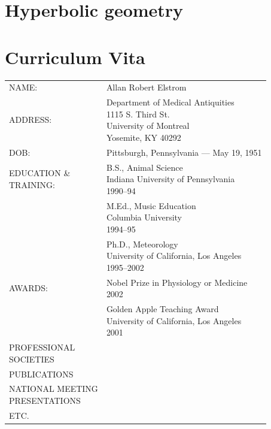 \documentclass{uoflthesis} %
\begin{document}
\nocite{*}



\appendix

\chapter{Hyperbolic geometry}

\lipsum

\chapter*{Curriculum Vita}

\singlespacing
\renewcommand{\arraystretch}{2}

\begin{tabular}{ll}
NAME: & Allan Robert Elstrom\\
ADDRESS: & \makecell[lt]{Department of Medical Antiquities\\1115 S. Third St.\\University of Montreal\\Yosemite, KY 40292}\\
DOB: & Pittsburgh, Pennsylvania --- May 19, 1951\\
\makecell[lb]{EDUCATION \&\\ TRAINING:} & \makecell[lt]{B.S., Animal Science\\Indiana University of Pennsylvania\\1990--94}\\
    &\makecell[lt]{M.Ed., Music Education\\Columbia University\\1994--95}\\
    &\makecell[lt]{Ph.D., Meteorology\\University of California, Los Angeles\\1995--2002}\\
AWARDS: & \makecell[lt]{Nobel Prize in Physiology or Medicine\\2002}\\
    &\makecell[lt]{Golden Apple Teaching Award\\University of California, Los Angeles\\2001}\\
\makecell[lb]{PROFESSIONAL\\SOCIETIES}\\
PUBLICATIONS\\
\makecell[lb]{NATIONAL MEETING\\PRESENTATIONS}\\
ETC.\\
\end{tabular}
\end{document}
